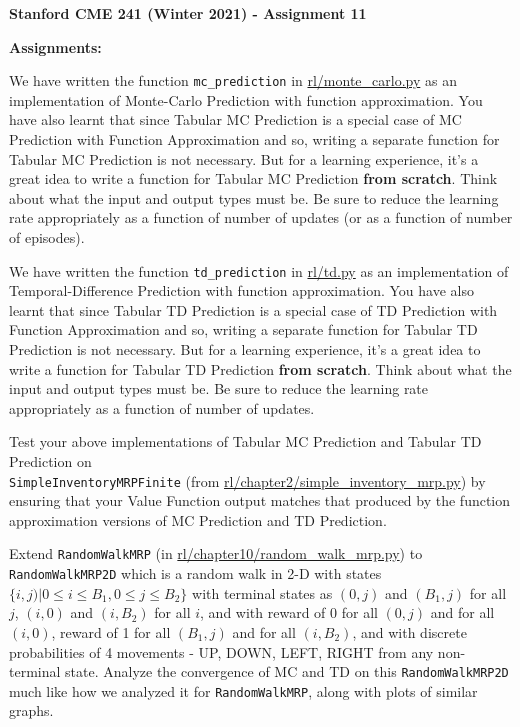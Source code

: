 \documentclass[12pt]{exam}
\begin{document}
\begin{center}
{\large {\bf Stanford CME 241 (Winter 2021) - Assignment 11}}
\end{center}
 
{\large{\bf Assignments:}}
\begin{questions}
\question We have written the function \lstinline{mc_prediction} in \href{https://github.com/TikhonJelvis/RL-book/blob/master/rl/monte_carlo.py}{rl\//monte\_carlo.py} as an implementation of Monte-Carlo Prediction with function approximation. You have also learnt that since Tabular MC Prediction is a special case of MC Prediction with Function Approximation and so, writing a separate function for Tabular MC Prediction is not necessary. But for a learning experience, it's a great idea to write a function for Tabular MC Prediction {\bf from scratch}. Think about what the input and output types must be. Be sure to reduce the learning rate appropriately as a function of number of updates (or as a function of number of episodes). 

\question We have written the function \lstinline{td_prediction} in \href{https://github.com/TikhonJelvis/RL-book/blob/master/rl/td.py}{rl\//td.py} as an implementation of Temporal-Difference Prediction with function approximation. You have also learnt that since Tabular TD Prediction is a special case of TD Prediction with Function Approximation and so, writing a separate function for Tabular TD Prediction is not necessary. But for a learning experience, it's a great idea to write a function for Tabular TD Prediction {\bf from scratch}. Think about what the input and output types must be. Be sure to reduce the learning rate appropriately as a function of number of updates. 

\question Test your above implementations of Tabular MC Prediction and Tabular TD Prediction on \\\lstinline{SimpleInventoryMRPFinite} (from \href{https://github.com/TikhonJelvis/RL-book/blob/master/rl/chapter2/simple_inventory_mrp.py}{rl\//chapter2\//simple\_inventory\_mrp.py}) by ensuring that your Value Function output matches that produced by the function approximation versions of MC Prediction and TD Prediction.

\question Extend \lstinline{RandomWalkMRP} (in \href{https://github.com/TikhonJelvis/RL-book/blob/master/rl/chapter10/random_walk_mrp.py}{rl\//chapter10\//random\_walk\_mrp.py}) to \lstinline{RandomWalkMRP2D} which is a random walk in 2-D with states $\{i, j) | 0 \leq i \leq B_1, 0 \leq j \leq B_2\}$ with terminal states as $(0, j)$ and $(B_1, j)$ for all $j$, $(i, 0)$ and $(i, B_2)$ for all $i$, and with reward of 0 for all $(0, j)$ and for all $(i, 0)$, reward of 1 for all $(B_1, j)$ and for all $(i, B_2)$, and with discrete probabilities of 4 movements - UP, DOWN, LEFT, RIGHT from any non-terminal state. Analyze the convergence of MC and TD on this \lstinline{RandomWalkMRP2D} much like how we analyzed it for \lstinline{RandomWalkMRP}, along with plots of similar graphs.

\end{questions}
\end{document}

